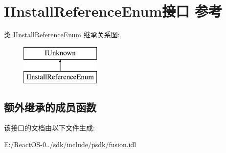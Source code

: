 \hypertarget{interface_i_install_reference_enum}{}\section{I\+Install\+Reference\+Enum接口 参考}
\label{interface_i_install_reference_enum}
类 I\+Install\+Reference\+Enum 继承关系图\+:\begin{figure}[H]
\begin{center}
\leavevmode
\includegraphics[height=2.000000cm]{interface_i_install_reference_enum}
\end{center}
\end{figure}
\subsection*{额外继承的成员函数}


该接口的文档由以下文件生成\+:\begin{DoxyCompactItemize}
\item 
E\+:/\+React\+O\+S-\/0../sdk/include/psdk/fusion.\+idl\end{DoxyCompactItemize}
